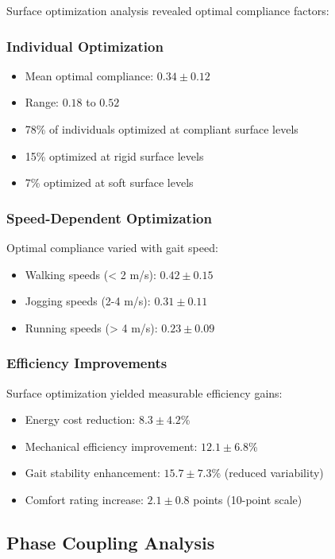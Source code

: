 \documentclass[12pt]{article}
\begin{document}
Surface optimization analysis revealed optimal compliance factors:

\subsubsection{Individual Optimization}
\begin{itemize}
\item Mean optimal compliance: $0.34 \pm 0.12$
\item Range: $0.18$ to $0.52$
\item 78\% of individuals optimized at compliant surface levels
\item 15\% optimized at rigid surface levels
\item 7\% optimized at soft surface levels
\end{itemize}

\subsubsection{Speed-Dependent Optimization}
Optimal compliance varied with gait speed:
\begin{itemize}
\item Walking speeds (< 2 m/s): $0.42 \pm 0.15$
\item Jogging speeds (2-4 m/s): $0.31 \pm 0.11$  
\item Running speeds (> 4 m/s): $0.23 \pm 0.09$
\end{itemize}

\subsubsection{Efficiency Improvements}
Surface optimization yielded measurable efficiency gains:
\begin{itemize}
\item Energy cost reduction: $8.3 \pm 4.2$\%
\item Mechanical efficiency improvement: $12.1 \pm 6.8$\%
\item Gait stability enhancement: $15.7 \pm 7.3$\% (reduced variability)
\item Comfort rating increase: $2.1 \pm 0.8$ points (10-point scale)
\end{itemize}

\subsection{Phase Coupling Analysis}
\end{document}
